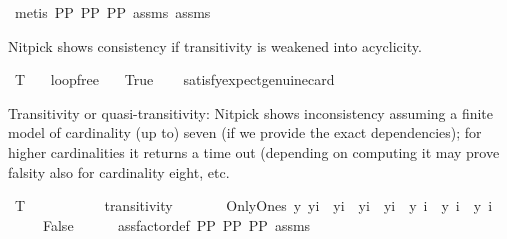 \begin{isabellebody}
%
\isatagproof
{}\isamarkupfalse%
\ {\isacharparenleft}{\kern0pt}metis\ PP{}\ PP{}\ PP{}\ assms{\isacharparenleft}{\kern0pt}{}{\isacharparenright}{\kern0pt}\ assms{\isacharparenleft}{\kern0pt}{}{\isacharparenright}{\kern0pt}{\isacharparenright}{\kern0pt}%
\endisatagproof
{\isafoldproof}%
%
\isadelimproof
%
\endisadelimproof
%
\begin{isamarkuptext}%
Nitpick shows consistency if transitivity is weakened into acyclicity.%
\end{isamarkuptext}\isamarkuptrue%
\isamarkupfalse%
\ T{}{\isacharcolon}{\kern0pt}\isanewline
\ \ \ loopfree\isanewline
\ \ \ True\isanewline
\ \ \isamarkupfalse%
\ {\isacharbrackleft}{\kern0pt}satisfy{\isacharcomma}{\kern0pt}expect{\isacharequal}{\kern0pt}genuine{\isacharcomma}{\kern0pt}card{\isacharequal}{\kern0pt}{}{\isacharbrackright}{\kern0pt}\ %
\isanewline
%
\isadelimproof
\ \ %
\endisadelimproof
%
\isatagproof
{}\isamarkupfalse%
%
\endisatagproof
{\isafoldproof}%
%
\isadelimproof
%
\endisadelimproof
%
\begin{isamarkuptext}%
Transitivity or quasi-transitivity: Nitpick shows inconsistency assuming a finite model
   of cardinality (up to) seven (if we provide the exact dependencies); for higher cardinalities 
   it returns a time out (depending on computing it may prove falsity also for cardinality eight, 
   etc.%
\end{isamarkuptext}\isamarkuptrue%
\isamarkupfalse%
\ T{}{\isacharcolon}{\kern0pt}\isanewline
\ \ \ \ \isanewline
\ \ \ \ \ \ transitivity\ \isanewline
\ \ \ \ \ \ OnlyOnes{\isacharcolon}{\kern0pt}\ {\isachardoublequoteopen}{\isasymforall}y{\isachardot}{\kern0pt}\ y{\isacharequal}{\kern0pt}i{}\ {\isasymor}\ y{\isacharequal}{\kern0pt}i{}\ {\isasymor}\ y{\isacharequal}{\kern0pt}i{}\ {\isasymor}\ y{\isacharequal}{\kern0pt}i{}\ {\isasymor}\ y{\isacharequal}{\kern0pt}\ i{}\ {\isasymor}\ y{\isacharequal}{\kern0pt}\ i{}\ {\isasymor}\ y{\isacharequal}{\kern0pt}\ i{}{\isachardoublequoteclose}\isanewline
\ \ \ \ \ False\isanewline
%
\isadelimproof
\ \ \ \ %
\endisadelimproof
%
\isatagproof
{}\isamarkupfalse%
\ assfactor{\isacharunderscore}{\kern0pt}def\ PP{}\ PP{}\ PP{}\ assms\ \isanewline

\end{isabellebody}
